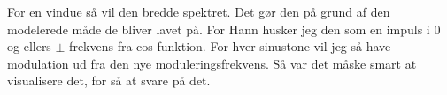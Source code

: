 \begin{rubrik}
\begin{eksamensOpgave}
\begin{UnderOpgave}
        \end{UnderOpgave}
        \begin{UnderOpgave}
            For en vindue så vil den bredde spektret. Det gør den på grund af den modelerede måde de bliver lavet på. 
            For Hann husker jeg den som en impuls i 0 og ellers $\pm$ frekvens fra cos funktion. 
            For hver sinustone vil jeg så have modulation ud fra den nye moduleringsfrekvens. Så var det måske smart at visualisere det, for så at svare på det. 
        \end{UnderOpgave}
    \end{eksamensOpgave}
\end{rubrik}

